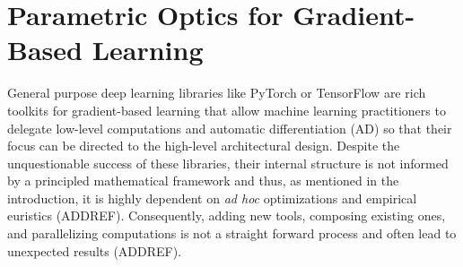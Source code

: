 \documentclass[11pt,a4paper,openright,twoside]{report}
\theoremstyle{plain}
\theoremstyle{definition}
\begin{document}
\tableofcontents
\rhead[\fancyplain{}{\bfseries\leftmark}]{\fancyplain{}{\bfseries\thepage}} 
\clearpage{\pagestyle{empty}\cleardoublepage}

























































\chapter{Parametric Optics for Gradient-Based Learning}

\lhead[\fancyplain{}{\bfseries\thepage}]{\fancyplain{}{\bfseries\rightmark}}




General purpose deep learning libraries like PyTorch or TensorFlow are rich toolkits for gradient-based learning that allow machine learning practitioners to delegate low-level computations and automatic differentiation (AD) so that their focus can be directed to the high-level architectural design. Despite the unquestionable success of these libraries, their internal structure is not informed by a principled mathematical framework and thus, as mentioned in the introduction, it is highly dependent on \textit{ad hoc} optimizations and empirical euristics (ADDREF). Consequently, adding new tools, composing existing ones, and parallelizing computations is not a straight forward process and often lead to unexpected results (ADDREF).
\end{document}
